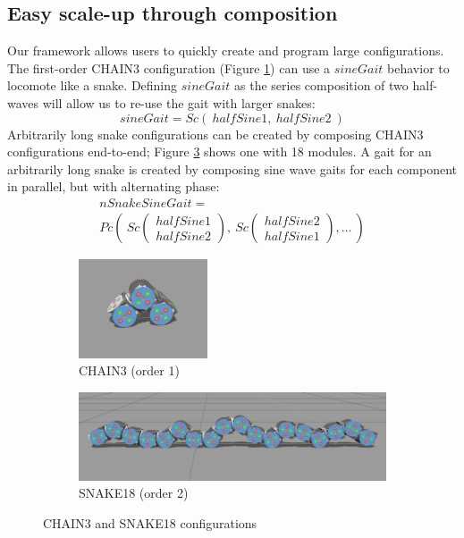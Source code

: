 \documentclass[conference]{IEEEtran}
\theoremstyle{definition}
\begin{document}
\subsection{Easy scale-up through composition}
Our framework allows users to quickly create and program large configurations. The
first-order CHAIN3 configuration (Figure \ref{fig:chain3}) can use a \(sineGait\)
behavior to locomote like a snake. Defining \(sineGait\)  as the series composition
of two half-waves will allow us to re-use the gait with larger snakes:
\begin{displaymath}
sineGait = Sc(~halfSine1,~halfSine2~)
\end{displaymath}
Arbitrarily long snake configurations can be created
by composing CHAIN3 configurations end-to-end; Figure \ref{fig:snake18} shows one with 18 modules.
A gait for an arbitrarily long snake is created by composing sine wave
gaits for each component in parallel, but with alternating phase:
\begin{align*}
nSnakeSineGait = ~~~~~~~~~~~~~~~~~~~~~~~~~~~~~~~~~~~~~~~~~~\\
Pc \left(~Sc\begin{pmatrix} halfSine1 \\ halfSine2 \end{pmatrix},
~Sc\begin{pmatrix} halfSine2 \\ halfSine1 \end{pmatrix},\ldots ~\right)
\end{align*}

\begin{figure}
        \begin{subfigure}{\columnwidth}
        \begin{center}
                \includegraphics[width=1.5in]{images/library/snake3.png}
        \end{center}
                \caption{CHAIN3 (order 1)}
                \label{fig:chain3}
        \end{subfigure}
        \begin{subfigure}{\columnwidth}
                \includegraphics[width=\columnwidth]{images/library/snake18.png}
                \caption{SNAKE18 (order 2)}
                \label{fig:snake18}
        \end{subfigure}
\caption{CHAIN3 and SNAKE18 configurations}
\end{figure}
\end{document}
